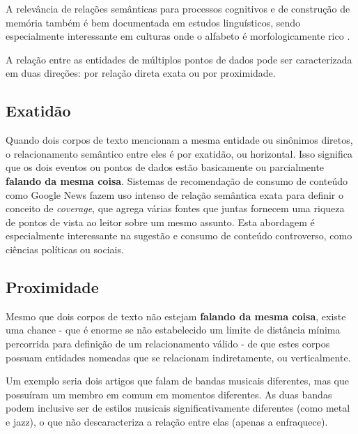 A relevância de relações semânticas para processos cognitivos e de construção de memória também é bem documentada em estudos linguísticos, sendo especialmente interessante em culturas onde o alfabeto é morfologicamente rico \cite{Bentin1990TheCO}.

A relação entre as entidades de múltiplos pontos de dados pode ser caracterizada em duas direções: por relação direta exata ou por proximidade.

\subsection{Exatidão}

Quando dois corpos de texto mencionam a mesma entidade ou sinônimos diretos, o relacionamento semântico entre eles é por exatidão, ou horizontal. Isso significa que os dois eventos ou pontos de dados estão basicamente ou parcialmente \textbf{falando da mesma coisa}. Sistemas de recomendação de consumo de conteúdo como Google News fazem uso intenso de relação semântica exata para definir o conceito de \textit{coverage}, que agrega várias fontes que juntas fornecem uma riqueza de pontos de vista ao leitor sobre um mesmo assunto. Esta abordagem é especialmente interessante na sugestão e consumo de conteúdo controverso, como ciências políticas ou sociais.

\subsection{Proximidade}

Mesmo que dois corpos de texto não estejam \textbf{falando da mesma coisa}, existe uma chance - que é enorme se não estabelecido um limite de distância mínima percorrida para definição de um relacionamento válido - de que estes corpos possuam entidades nomeadas que se relacionam indiretamente, ou verticalmente.

Um exemplo seria dois artigos que falam de bandas musicais diferentes, mas que possuíram um membro em comum em momentos diferentes. As duas bandas podem inclusive ser de estilos musicais significativamente diferentes (como metal e jazz), o que não descaracteriza a relação entre elas (apenas a enfraquece).